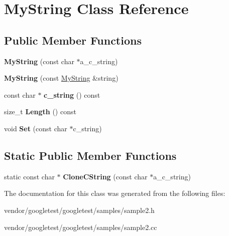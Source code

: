 \hypertarget{class_my_string}{}\section{My\+String Class Reference}
\label{class_my_string}
\subsection*{Public Member Functions}
\begin{DoxyCompactItemize}
\item 
\mbox{\label{class_my_string_a28134eb91b6698f46b12accefa157d0f}} 
{\bfseries My\+String} (const char $\ast$a\+\_\+c\+\_\+string)
\item 
\mbox{\label{class_my_string_ae24c7cf89a58dd2287303df2ac054c66}} 
{\bfseries My\+String} (const \mbox{\hyperlink{class_my_string}{My\+String}} \&string)
\item 
\mbox{\label{class_my_string_aff2af0cf30db39fe24a235670ee6ff25}} 
const char $\ast$ {\bfseries c\+\_\+string} () const
\item 
\mbox{\label{class_my_string_a4eb168b1ec401a732b3859abe004d648}} 
size\+\_\+t {\bfseries Length} () const
\item 
\mbox{\label{class_my_string_a521c4cd7eccac6ce554d8a51505e4970}} 
void {\bfseries Set} (const char $\ast$c\+\_\+string)
\end{DoxyCompactItemize}
\subsection*{Static Public Member Functions}
\begin{DoxyCompactItemize}
\item 
\mbox{\label{class_my_string_a40753dcfa3314a8993f32bdd75d67ce2}} 
static const char $\ast$ {\bfseries Clone\+C\+String} (const char $\ast$a\+\_\+c\+\_\+string)
\end{DoxyCompactItemize}


The documentation for this class was generated from the following files\+:\begin{DoxyCompactItemize}
\item 
vendor/googletest/googletest/samples/sample2.\+h\item 
vendor/googletest/googletest/samples/sample2.\+cc\end{DoxyCompactItemize}
